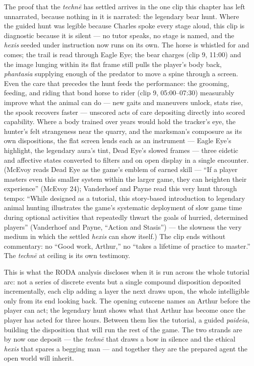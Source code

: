 The proof that the \textit{technē} has settled arrives in the one clip this chapter has left unnarrated, because nothing in it is narrated: the legendary bear hunt. Where the guided hunt was legible because Charles spoke every stage aloud, this clip is diagnostic because it is silent — no tutor speaks, no stage is named, and the \textit{hexis} seeded under instruction now runs on its own. The horse is whistled for and comes; the trail is read through Eagle Eye; the bear charges (clip 9, 11:00) and the image lunging within its flat frame still pulls the player's body back, \textit{phantasia} supplying enough of the predator to move a spine through a screen. Even the care that precedes the hunt feeds the performance: the grooming, feeding, and riding that bond horse to rider (clip 9, 05:00–07:30) measurably improve what the animal can do — new gaits and maneuvers unlock, stats rise, the spook recovers faster — unscored acts of care depositing directly into scored capability. Where a body trained over years would hold the tracker's eye, the hunter's felt strangeness near the quarry, and the marksman's composure as its own dispositions, the flat screen lends each as an instrument — Eagle Eye's highlight, the legendary aura's tint, Dead Eye's slowed frames — three eidetic and affective states converted to filters and on open display in a single encounter.
(McEvoy reads Dead Eye as the game's emblem of earned skill — ``If a player masters even this smaller system within the larger game, they can heighten their experience'' (McEvoy 24); Vanderhoef and Payne read this very hunt through tempo: ``While designed as a tutorial, this story-based introduction to legendary animal hunting illustrates the game's systematic deployment of slow game time during optional activities that repeatedly thwart the goals of hurried, determined players'' (Vanderhoef and Payne, ``Action and Stasis'') — the slowness the very medium in which the settled \textit{hexis} can show itself.) The clip ends without commentary: no ``Good work, Arthur,'' no ``takes a lifetime of practice to master.'' The \textit{technē} at ceiling is its own testimony.

This is what the RODA analysis discloses when it is run across the whole tutorial arc: not a series of discrete events but a single compound disposition deposited incrementally, each clip adding a layer the next draws upon, the whole intelligible only from its end looking back. The opening cutscene names an Arthur before the player can act; the legendary hunt shows what that Arthur has become once the player has acted for three hours. Between them lies the tutorial, a guided \textit{paideia}, building the disposition that will run the rest of the game. The two strands are by now one deposit — the \textit{technē} that draws a bow in silence and the ethical \textit{hexis} that spares a begging man — and together they are the prepared agent the open world will inherit.

